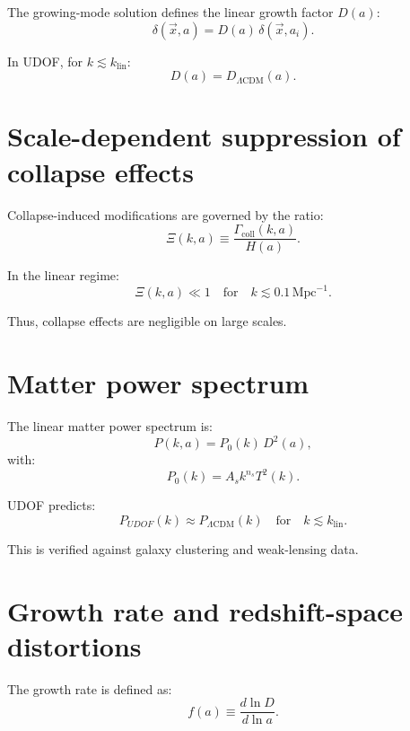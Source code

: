 \documentclass[11pt]{book}
\newcommand{\udof}{UDOF}
\begin{document}
The growing-mode solution defines the linear growth factor $D(a)$:
\begin{equation}
\delta(\vec{x},a) = D(a)\,\delta(\vec{x},a_i).
\end{equation}

In UDOF, for $k \lesssim k_{\mathrm{lin}}$:
\begin{equation}
D(a) = D_{\Lambda\mathrm{CDM}}(a).
\end{equation}

\section{Scale-dependent suppression of collapse effects}

Collapse-induced modifications are governed by the ratio:
\begin{equation}
\Xi(k,a) \equiv \frac{\Gamma_{\mathrm{coll}}(k,a)}{H(a)}.
\end{equation}

In the linear regime:
\begin{equation}
\Xi(k,a) \ll 1
\quad
\text{for}
\quad
k \lesssim 0.1\,\mathrm{Mpc}^{-1}.
\end{equation}

Thus, collapse effects are negligible on large scales.

\section{Matter power spectrum}

The linear matter power spectrum is:
\begin{equation}
P(k,a) = P_0(k)\,D^2(a),
\end{equation}
with:
\begin{equation}
P_0(k) = A_s k^{n_s} T^2(k).
\end{equation}

UDOF predicts:
\begin{equation}
P_{\udof}(k) \approx P_{\Lambda\mathrm{CDM}}(k)
\quad
\text{for}
\quad
k \lesssim k_{\mathrm{lin}}.
\end{equation}

This is verified against galaxy clustering and weak-lensing data.

\section{Growth rate and redshift-space distortions}

The growth rate is defined as:
\begin{equation}
f(a) \equiv \frac{d\ln D}{d\ln a}.
\end{equation}
\end{document}
